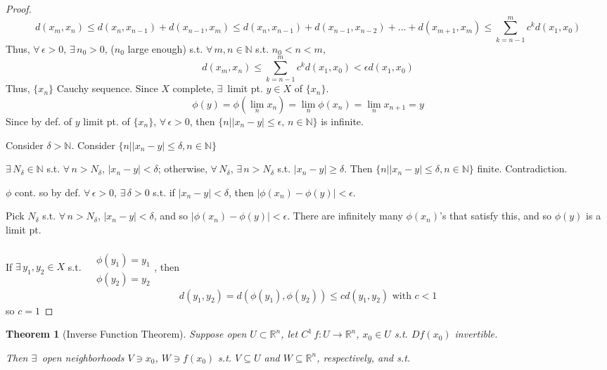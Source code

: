 \documentclass[10pt]{amsart}
\newtheorem{theorem}{Theorem}
\begin{document}
\begin{multicols*}{2}
\begin{proof}
\[
d(x_m,x_n) \leq d(x_n,x_{n-1}) + d(x_{n-1},x_m) \leq d(x_n,x_{n-1}) + d(x_{n-1},x_{n-2}) + \dots + d(x_{m+1},x_m) \leq \sum_{k=n-1}^m c^k d(x_1,x_0)
\]
Thus, $\forall \, \epsilon >0$, $\exists \, n_0 >0$, ($n_0$ large enough) s.t. $\forall \, m ,n\in \mathbb{N}$ s.t. $n_0 < n <m$, 
\[
d(x_m,x_n) \leq \sum_{k=n-1}^m c^k d(x_1,x_0) < \epsilon d(x_1,x_0)
\]
Thus, $\lbrace x_n \rbrace$ Cauchy sequence.  Since $X$ complete, $\exists \, $ limit pt. $y \in X$ of $\lbrace x_n \rbrace$.  
\[
\phi(y) = \phi(\lim_n x_n) = \lim_n \phi(x_n) = \lim_n x_{n+1} = y
\]
Since by def. of $y$ limit pt. of $\lbrace x_n \rbrace$, $\forall \, \epsilon >0$, then $\lbrace n | |x_n -y|\leq \epsilon, \, n \in \mathbb{N}\rbrace$ is infinite.  

Consider $\delta > \mathbb{N}$.  Consider $\lbrace n | |x_n-y| \leq \delta, n \in \mathbb{N}\rbrace$ 

$\exists \, N_{\delta} \in \mathbb{N}$ s.t. $\forall \, n > N_{\delta}$, $|x_n-y|< \delta$; otherwise, $\forall \, N_{\delta}$, $\exists \, n > N_{\delta}$ s.t. $|x_n - y| \geq \delta$.  Then $\lbrace n | |x_n -y| \leq \delta , n \in \mathbb{N} \rbrace$ finite.  Contradiction.  

$\phi$ cont. so by def. $\forall \, \epsilon >0$, $\exists \, \delta >0$ s.t. if $|x_n -y| < \delta$, then $|\phi(x_n) - \phi(y) | < \epsilon$.  

Pick $N_{\delta}$ s.t. $\forall \, n > N_{\delta}$, $|x_n-y| < \delta$, and so $|\phi(x_n) - \phi(y)|< \epsilon$. There are infinitely many $\phi(x_n)$'s that satisfy this, and so $\phi(y)$ is a limit pt.  

If $\exists \, y_1,y_2 \in X$ s.t. $\begin{aligned} & \quad \\
  & \phi(y_1) = y_1 \\ 
  & \phi(y_2) = y_2 \end{aligned}$, then
\[
d(y_1,y_2) = d(\phi(y_1), \phi(y_2)) \leq c d(y_1,y_2) \text{ with } c <1
\]
so $c=1$
\end{proof}


\begin{theorem}[Inverse Function Theorem]
  Suppose open $U \subset \mathbb{R}^n$, let $C^1 \, f: U \to \mathbb{R}^n$, $x_0 \in U$ s.t. $Df(x_0)$ invertible.  


Then $\exists \,$ open neighborhoods $V\ni x_0$, $W \ni f(x_0)$ s.t. $V\subseteq U$ and $W\subseteq \mathbb{R}^n$, respectively, and s.t.


\end{theorem}
\end{multicols*}
\end{document}
